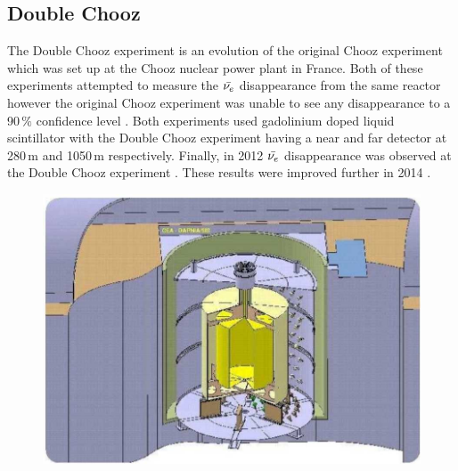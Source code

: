 \subsection{Double Chooz}
The Double Chooz experiment is an evolution of the original Chooz experiment which was set up at the Chooz nuclear power plant in France\cite{lasserre2006}. Both of these experiments attempted to measure the $\Bar{\nu_e}$ disappearance from the same reactor however the original Chooz experiment was unable to see any disappearance to a 90$\,\%$ confidence level \cite{Apollonio_2003}. Both experiments used gadolinium doped liquid scintillator with the Double Chooz experiment having a near and far detector at 280\,m and 1050\,m respectively\cite{lasserre2006}. Finally, in 2012 $\Bar{\nu_e}$ disappearance was observed at the Double Chooz experiment \cite{Abe_2012}. These results were improved further in 2014 \cite{abe2014improved}.
\begin{figure}[!h]
 \centering
 \includegraphics[width=0.5\linewidth]{Chapter1/Figs/doublChoozDetectorDiagram.jpg} %
 \label{DoubleChoozNearDetector}
\end{figure}
